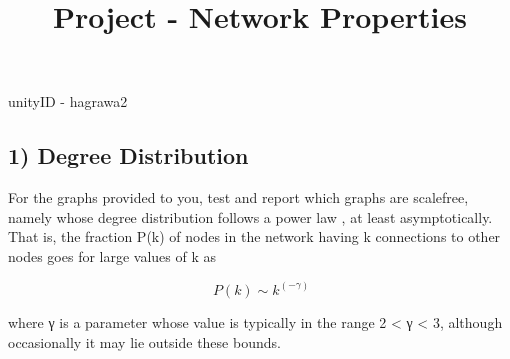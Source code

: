 \documentclass[11pt]{article}
\title{Project - Network Properties}
\begin{document}
    
    
    \maketitle
    
    

    
    unityID - hagrawa2

\hypertarget{degree-distribution}{%
\subsection{1) Degree Distribution}\label{degree-distribution}}

For the graphs provided to you, test and report which graphs are
scalefree, namely whose degree distribution follows a power law , at
least asymptotically. That is, the fraction P(k) of nodes in the network
having k connections to other nodes goes for large values of k as

\begin{equation*}
\ P(k) \sim k^{(-\gamma)} 
\end{equation*}

where γ is a parameter whose value is typically in the range 2
\textless{} γ \textless{} 3, although occasionally it may lie outside
these bounds.
\end{document}
